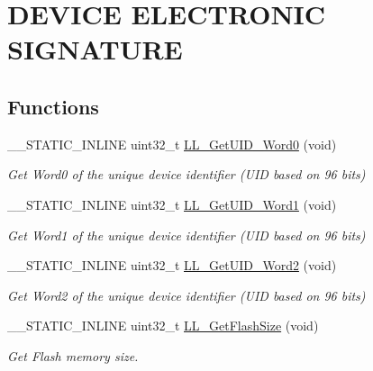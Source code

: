 \hypertarget{group___u_t_i_l_s___e_f___d_e_v_i_c_e___e_l_e_c_t_r_o_n_i_c___s_i_g_n_a_t_u_r_e}{}\section{D\+E\+V\+I\+CE E\+L\+E\+C\+T\+R\+O\+N\+IC S\+I\+G\+N\+A\+T\+U\+RE}
\label{group___u_t_i_l_s___e_f___d_e_v_i_c_e___e_l_e_c_t_r_o_n_i_c___s_i_g_n_a_t_u_r_e}
\subsection*{Functions}
\begin{DoxyCompactItemize}
\item 
\+\_\+\+\_\+\+S\+T\+A\+T\+I\+C\+\_\+\+I\+N\+L\+I\+NE uint32\+\_\+t \hyperlink{group___u_t_i_l_s___e_f___d_e_v_i_c_e___e_l_e_c_t_r_o_n_i_c___s_i_g_n_a_t_u_r_e_ga3a0b557447143f41b93a7fa45270b5b8}{L\+L\+\_\+\+Get\+U\+I\+D\+\_\+\+Word0} (void)
\begin{DoxyCompactList}\small\item\em Get Word0 of the unique device identifier (U\+ID based on 96 bits) \end{DoxyCompactList}\item 
\+\_\+\+\_\+\+S\+T\+A\+T\+I\+C\+\_\+\+I\+N\+L\+I\+NE uint32\+\_\+t \hyperlink{group___u_t_i_l_s___e_f___d_e_v_i_c_e___e_l_e_c_t_r_o_n_i_c___s_i_g_n_a_t_u_r_e_ga67007778e77a6fafc8a1fc440dc208b2}{L\+L\+\_\+\+Get\+U\+I\+D\+\_\+\+Word1} (void)
\begin{DoxyCompactList}\small\item\em Get Word1 of the unique device identifier (U\+ID based on 96 bits) \end{DoxyCompactList}\item 
\+\_\+\+\_\+\+S\+T\+A\+T\+I\+C\+\_\+\+I\+N\+L\+I\+NE uint32\+\_\+t \hyperlink{group___u_t_i_l_s___e_f___d_e_v_i_c_e___e_l_e_c_t_r_o_n_i_c___s_i_g_n_a_t_u_r_e_gaa15df2bc902d392f67ee9873943d4904}{L\+L\+\_\+\+Get\+U\+I\+D\+\_\+\+Word2} (void)
\begin{DoxyCompactList}\small\item\em Get Word2 of the unique device identifier (U\+ID based on 96 bits) \end{DoxyCompactList}\item 
\+\_\+\+\_\+\+S\+T\+A\+T\+I\+C\+\_\+\+I\+N\+L\+I\+NE uint32\+\_\+t \hyperlink{group___u_t_i_l_s___e_f___d_e_v_i_c_e___e_l_e_c_t_r_o_n_i_c___s_i_g_n_a_t_u_r_e_ga0e8379766a1799f3c5fedadaa2b0c47e}{L\+L\+\_\+\+Get\+Flash\+Size} (void)
\begin{DoxyCompactList}\small\item\em Get Flash memory size. \end{DoxyCompactList}\end{DoxyCompactItemize}


